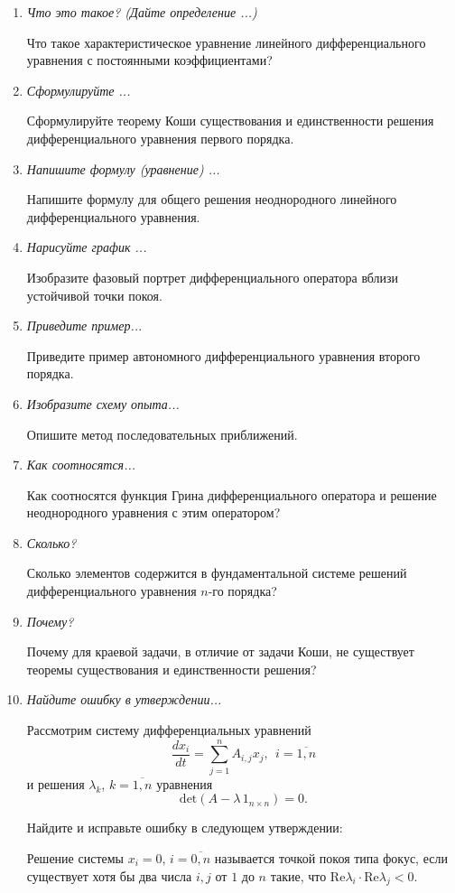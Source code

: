 \documentclass[a4paper, 12pt]{article}
\begin{document}
\begin{enumerate}
	\item \textit{Что это такое? (Дайте определение ...)}

		Что такое характеристическое уравнение линейного дифференциального уравнения с постоянными коэффициентами?

	\item\textit{Сформулируйте ...}

		Сформулируйте теорему Коши существования и единственности решения дифференциального уравнения первого порядка.

	\item\textit{Напишите формулу (уравнение) ...}

		Напишите формулу для общего решения неоднородного линейного дифференциального уравнения.

	\item \textit{Нарисуйте график ...}

		Изобразите фазовый портрет дифференциального оператора вблизи устойчивой точки покоя.

	\item \textit{Приведите пример...}

		Приведите пример автономного дифференциального уравнения второго порядка.

	\item \textit{Изобразите схему опыта...}

		Опишите метод последовательных приближений.

	\item \textit{Как соотносятся...}

		Как соотносятся функция Грина дифференциального оператора и решение неоднородного уравнения с этим оператором?

	\item \textit{Сколько?}

		Сколько элементов содержится в фундаментальной системе решений дифференциального уравнения $n$-го порядка?

	\item \textit{Почему?}

		Почему для краевой задачи, в отличие от задачи Коши, не существует теоремы существования и единственности решения?

	\item \textit{Найдите ошибку в утверждении...}

		Рассмотрим систему дифференциальных уравнений
		$$\frac{d x_i}{d t} = \sum_{j=1}^{n} A_{i,j} x_j,\ \ i=\overline{1,n}$$
		и решения $\lambda_k$, $k=\overline{1,n}$ уравнения
		$$\mathrm{det}(A-\lambda\,1_{n\times n}) = 0.$$

		Найдите и исправьте ошибку в следующем утверждении:

		Решение системы $x_i = 0$, $i = \overline{0, n}$ называется точкой покоя типа фокус, если существует хотя бы два числа $i, j$ от $1$ до $n$ такие, что $\mathrm{Re} \lambda_i \cdot \mathrm{Re} \lambda_j < 0$.
\end{enumerate}
\end{document}

